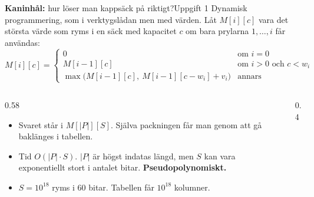 \documentclass[aspectratio=169,10pt]{beamer}
\newcommand{\rabbit}{\textcolor{warnorange}{\textbf{Kaninhål:}} }
\begin{document}
\begin{frame}{\rabbit hur löser man kappsäck på riktigt?}{Uppgift 1}
  Dynamisk programmering, som i verktygslådan men med värden. Låt $M[i][c]$ vara det största värde som ryms i en säck med kapacitet $c$ om bara prylarna $1,\dots,i$ får användas:
  \[
    M[i][c]=\begin{cases}
      0 & \text{om } i=0\\
      M[i-1][c] & \text{om } i>0 \text{ och } c<w_i\\
      \max\bigl(M[i-1][c],\ M[i-1][c-w_i]+v_i\bigr) & \text{annars}
    \end{cases}
  \]
  \begin{columns}[T]
    \begin{column}{0.58\textwidth}
      \begin{itemize}
        \item<2-> Svaret står i $M[|P|][S]$. Själva packningen får man genom att gå baklänges i tabellen.
        \item<3-> Tid $O(|P|\cdot S)$. $|P|$ är högst indatas längd, men $S$ kan vara exponentiellt stort i antalet bitar. \textbf{Pseudopolynomiskt.}
        \item<4-> $S=10^{18}$ ryms i 60 bitar. Tabellen får $10^{18}$ kolumner.
      \end{itemize}
    \end{column}
    \begin{column}{0.4\textwidth}
    \end{column}
  \end{columns}
\end{frame}
\end{document}
